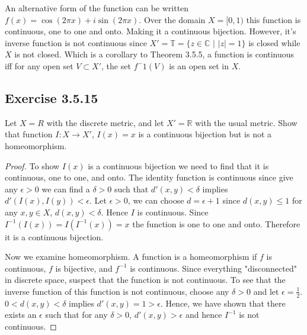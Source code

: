 \documentclass{tufte-book}
\theoremstyle{mytheoremstyle}
\theoremstyle{mylemstyle}
\theoremstyle{mydefstyle}
\begin{document}
An alternative form of the function can be written $f(x) = \cos(2 \pi x) + i \sin(2\pi x)$.   Over the domain $X=[0,1)$ this function is continuous, one to one and onto.  Making it a continuous bijection.  However, it's inverse function is not continuous since $X' = \mathbb{T} = \{z \in \mathbb{C}\text{ | } |z| = 1 \}$ is closed while $X$ is not closed.  Which is a corollary to Theorem 3.5.5, a function is continuous iff for any open set $V \subset X'$, the set $f^-1(V)$ is an open set in $X$.

\subsection{Exercise 3.5.15}
Let $X=R$ with the discrete metric, and let $X' = \mathbb{R}$ with the usual metric.  Show that function $I: X \to X'$, $I(x) = x$ is a continuous bijection but is not a homeomorphism.

\begin{proof}
To show $I(x)$ is a continuous bijection we need to find that it is continuous, one to one, and onto.   The identity function is continuous since give any $\epsilon >0$ we can find a $\delta >0$ such that $d'(x,y) <  \delta$ implies $d'(I(x), I(y)) < \epsilon$.    Let $\epsilon > 0$, we can choose $d = \epsilon + 1$ since $d(x,y) \leq 1$ for any $x, y \in X$, $d(x, y) < \delta$.  Hence $I$ is continuous.  Since $I^{-1}(I(x)) = I(I^{-1}(x))=x$ the function is one to one and onto.  Therefore it is a continuous bijection.

Now we examine homeomorphism.  A function is a homeomorphism if $f$ is continuous, $f$ is bijective,  and $f^{-1}$ is continuous.   Since everything "disconnected" in discrete space, suspect that the function is not continuous. To see that the inverse function of this function is not continuous, choose any $\delta >0$ and let $\epsilon = \frac{1}{2}$.   $0<d(x, y) < \delta$ implies $d'(x, y) = 1 > \epsilon$.  Hence, we have shown that there exists an $\epsilon$ such that for any $\delta >0$, $d'(x,y) > \epsilon$ and hence $I^{-1}$ is not continuous.

\end{proof}
\end{document}
